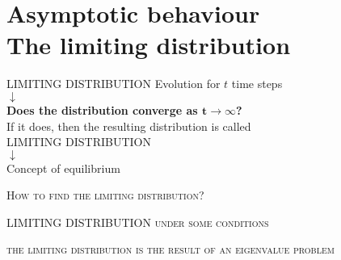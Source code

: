 \section{Asymptotic behaviour\\\small{The limiting distribution}}
  \begin{frame}{LIMITING DISTRIBUTION}
    \centering
    Evolution for $t$ time steps\\\medskip
    $\downarrow$\\\medskip
    \large \textbf{Does the distribution converge as $\mathbf{t \rightarrow \infty}$?}\\\medskip \small If it does, then the resulting distribution is called \medskip
    \\\medskip
    \Large
    \MakeUppercase{\alert{Limiting distribution}}\\\medskip
    $\downarrow$\\\medskip
    \normalsize
    Concept of \alert{equilibrium}
  \end{frame}

  \begin{frame}
    \centering\Large
    \textsc{How to find the limiting distribution?}\\
    \vspace{30pt}
  \end{frame}

  \begin{frame}{LIMITING DISTRIBUTION}
    \centering
      \vspace{30pt}
      \textsc{under some conditions}

      \vspace{10pt}
      \Large
      \textsc{\alert{the limiting distribution is the result of an eigenvalue problem}}
  \end{frame}
  
